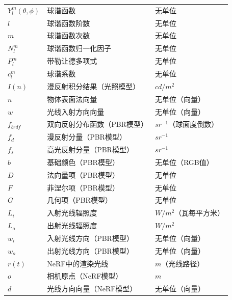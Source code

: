 \begin{nomenclature}
\begin{table}[htbp]
\begin{tabular}{>{\centering\arraybackslash}m{4cm} >{\centering\arraybackslash}m{6cm} >{\centering\arraybackslash}m{3cm}}
      $Y_l^m(\theta, \phi)$ & 球谐函数                          & 无单位 \\
      $l$          & 球谐函数阶数                          & 无单位 \\
      $m$          & 球谐函数次数                          & 无单位 \\
      $N_l^m$      & 球谐函数归一化因子                    & 无单位 \\
      $P_l^m$      & 带勒让德多项式                        & 无单位 \\
      $c_l^m$      & 球谐系数                              & 无单位 \\
      $I(n)$       & 漫反射积分结果（光照模型）             & $cd/m^2$ \\
      $n$          & 物体表面法向量                        & 无单位（向量） \\
      $w$          & 光线入射方向向量                      & 无单位（向量） \\
      $f_{brdf}$   & 双向反射分布函数（PBR模型）           & $sr^{-1}$（球面度倒数） \\
      $f_d$        & 漫反射分量（PBR模型）                 & $sr^{-1}$ \\
      $f_s$        & 高光反射分量（PBR模型）               & $sr^{-1}$ \\
      $b$          & 基础颜色（PBR模型）                   & 无单位（RGB值） \\
      $D$          & 法向量项（PBR模型）                   & 无单位 \\
      $F$          & 菲涅尔项（PBR模型）                   & 无单位 \\
      $G$          & 几何项（PBR模型）                     & 无单位 \\
      $L_i$        & 入射光线辐照度                        & $W/m^2$（瓦每平方米） \\
      $L_o$        & 出射光线辐照度                        & $W/m^2$ \\
      $w_i$        & 入射光线方向（PBR模型）               & 无单位（向量） \\
      $w_o$        & 出射光线方向（PBR模型）               & 无单位（向量） \\
      $r(t)$       & NeRF中的渲染光线                      & $m$（光线路径） \\
      $o$          & 相机原点（NeRF模型）                  & $m$ \\
      $d$          & 光线方向向量（NeRF模型）              & 无单位（向量） \\

\end{tabular}
\end{table}
\end{nomenclature}
